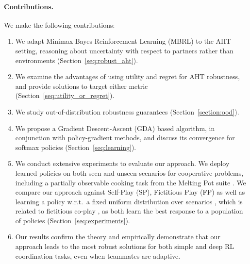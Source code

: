 



\paragraph{Contributions.} We make the following contributions: 
\begin{enumerate}[topsep=4pt, leftmargin=12pt]
    \item We adapt Minimax-Bayes Reinforcement Learning (MBRL) \citep{buening_minimax_bayes_reinforcement_2023} to the AHT setting, reasoning about uncertainty with respect to partners rather than environments (Section~\ref{seq:robust_aht}).
    \item We examine the advantages of using utility and regret for AHT robustness, and provide solutions to target either metric (Section~\ref{seq:utility_or_regret}).
    \item We study out-of-distribution robustness guarantees (Section~\ref{section:ood}).
    \item We propose a Gradient Descent-Ascent (GDA) \citep{lin_gradient_descent_ascent_2020} based algorithm, in conjunction with policy-gradient methods, and discuss its convergence for softmax policies (Section~\ref{seq:learning}).
    \item We conduct extensive experiments to evaluate our approach. We deploy learned policies on both seen and unseen scenarios for cooperative problems, including a partially observable cooking task from the Melting Pot suite \citep{leibo_scalable_evaluation_multi_2021, agapiou_melting_pot_2_2023}. We compare our approach against Self-Play (SP), Fictitious Play (FP) \citep{brown_iterative_solution_games_1951, heinrich_fictitious_self_play_2015} as well as learning a policy w.r.t.\ a fixed uniform distribution over scenarios \citep{lupu_trajectory_diversity_zero_2021}, which is related to fictitious co-play \citep{strouse_collaboration_with_humans_2021}, as both learn the best response to a population of policies (Section~\ref{seq:experiments}).
    \item Our results confirm the theory and empirically demonstrate that our approach leads to the most robust solutions for both simple and deep RL coordination tasks, even when teammates are adaptive. 
\end{enumerate}